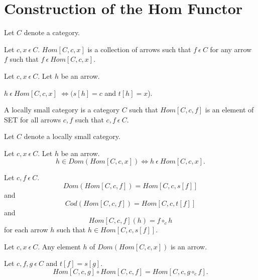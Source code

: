 \documentclass{article}
\newcommand{\mcirc}{\circ_{c}}
\newcommand{\inn}{~\epsilon~}
\newcommand{\innn}{~\epsilon~} %
\begin{document}
	\section{Construction of the Hom Functor}
	

	
	\begin{forthel}
		
		Let $C$ denote a category.	
		
		\begin{signature}
			Let $c,x \innn C$. 
			$Hom[C,c,x]$ is a collection of arrows such that $f \inn C$ for any arrow $f$ such that $f \inn Hom[C,c,x]$.
		\end{signature}
		
		\begin{axiom} 
			Let $c,x \innn C$. Let $h$ be an arrow. 
			\begin{center}
				$h \inn Hom[C,c,x]$ $\iff (s[h]=c$ and $t[h]=x$).
			\end{center}
		\end{axiom} 
				
		\begin{definition}
			A locally small category is a category $C$ such that 
			$Hom[C,c,f]$ is an element of SET for all arrows $c,f$ such that $c,f \inn C$.
		\end{definition}
		
		
		Let $C$ denote a locally small category.
		
		\begin{axiom}
			Let $c,x \innn C$. Let $h$ be an arrow. 
			$$h \in Dom(Hom[C,c,x]) \iff h \inn Hom[C,c,x].$$
		\end{axiom}

		
		\begin{axiom}
			Let $c,f \innn C$.
			$$Dom(Hom[C,c,f]) = Hom[C,c,s[f]]$$ and 
			$$Cod(Hom[C,c,f]) = Hom[C,c,t[f]]$$ and
			$$Hom[C,c,f](h) = f \mcirc h$$ for each arrow $h$ such that $h \in Hom[C,c,s[f]]$.
		\end{axiom}

		\begin{axiom} 
			Let $c,x \innn C$. Any element $h$ of $Dom(Hom[C,c,x])$ is an arrow.
		\end{axiom}
		
		\begin{axiom}[funct]
			Let $c,f,g \innn C$ and $t[f]=s[g]$.
			$$Hom[C,c,g] \circ Hom[C,c,f] = Hom[C,c,g \mcirc f].$$
		\end{axiom}

		


\end{forthel}
\end{document}
